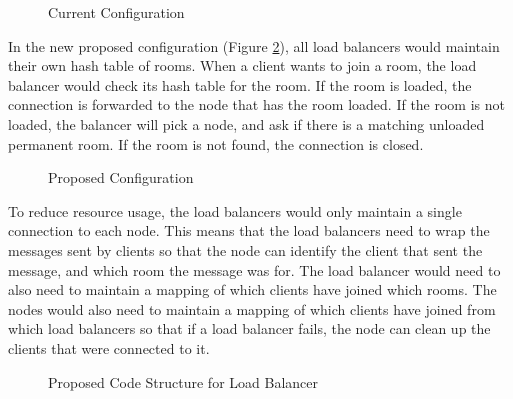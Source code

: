 \begin{figure}[htb]
  \centering
  \caption{\label{Figure::old-architecture} Current Configuration}
\end{figure}

In the new proposed configuration (Figure \ref{Figure::new-architecture}), all
load balancers would maintain their own hash table of rooms. When a client
wants to join a room, the load balancer would check its hash table for the
room. If the room is loaded, the connection is forwarded to the node that
has the room loaded. If the room is not loaded, the balancer will pick a node,
and ask if there is a matching unloaded permanent room. If the room is not found,
the connection is closed.

\begin{figure}[htb]
  \centering
  \caption{\label{Figure::new-architecture} Proposed Configuration}
\end{figure}

To reduce resource usage, the load balancers would only maintain a single
connection to each node. This means that the load balancers need to wrap the
messages sent by clients so that the node can identify the client that sent
the message, and which room the message was for. The load balancer would need
to also need to maintain a mapping of which clients have joined which rooms.
The nodes would also need to maintain a mapping of which clients have joined
from which load balancers so that if a load balancer fails, the node can clean
up the clients that were connected to it.

\begin{figure}[htb]
  \centering
  \caption{\label{Figure::uml-load-balancer} Proposed Code Structure for Load Balancer}
\end{figure}
